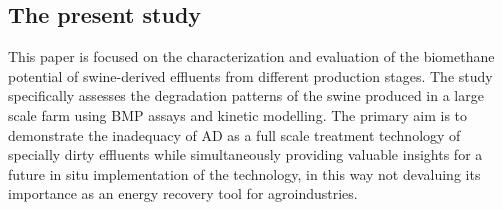 \subsection{The present study}
This paper is focused on the characterization and evaluation of the biomethane potential of swine-derived effluents from different production stages. The study specifically assesses the degradation patterns of the swine  produced in a large scale farm using BMP assays and kinetic modelling. The primary aim is to demonstrate the inadequacy of AD as a full scale treatment technology of specially dirty effluents while simultaneously providing valuable insights for a future in situ implementation of the technology, in this way not devaluing its importance as an energy recovery tool for agroindustries.